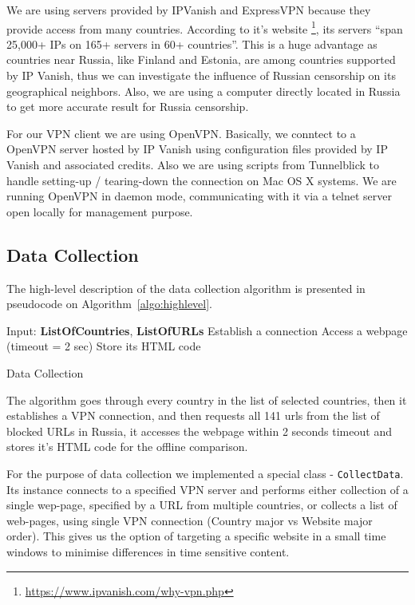 \documentclass[conference]{IEEEtran}
\newcommand{\code}[1]{\texttt{#1}}
\begin{document}
We are using servers provided by IPVanish and ExpressVPN because they provide access from many countries.
According to it's website \footnote{\url{https://www.ipvanish.com/why-vpn.php}}, its servers ``span 25,000+ IPs on 165+ servers in 60+ countries''.
This is a huge advantage as countries near Russia, like Finland and Estonia, are among countries supported by
IP Vanish, thus we can investigate the influence of  Russian censorship on its geographical neighbors.
Also, we are using a computer directly located in Russia to get more accurate result for Russia censorship.

For our VPN client we are using OpenVPN. 
Basically, we conntect to a OpenVPN server hosted by IP Vanish using configuration files provided by IP Vanish and associated credits.
Also we are using scripts from Tunnelblick to handle setting-up / tearing-down the connection on Mac OS X systems.
We are running OpenVPN in daemon mode, communicating with it via a telnet server open locally for management purpose.

\subsection{Data Collection}
The high-level description of the data collection algorithm is presented in pseudocode on Algorithm~\ref{algo:highlevel}.

\begin{algorithm}
        \SetAlgoLined
        Input: \textbf{ListOfCountries}, \textbf{ListOfURLs}\;
        {
            Establish a connection\;
            {
                Access a webpage (timeout = 2 sec)\;
                Store its HTML code\;
            }
        }
        \caption{Data Collection}
        \label{algo:highlevel}
\end{algorithm}

The algorithm goes through every country in the list of selected countries, then it establishes a VPN connection, and then requests all 141 urls from the list of blocked URLs in Russia, it accesses the webpage within 2 seconds timeout and stores it's HTML code for the offline comparison.

For the purpose of data collection we implemented a special class - \code{CollectData}. Its instance connects to a specified VPN server and performs either collection of a single wep-page, specified by a URL from multiple countries, or collects a list of web-pages, using single VPN connection (Country major vs Website major order).
This gives us the option of targeting a specific website in a small time windows to minimise differences in time sensitive content. 
\end{document}
